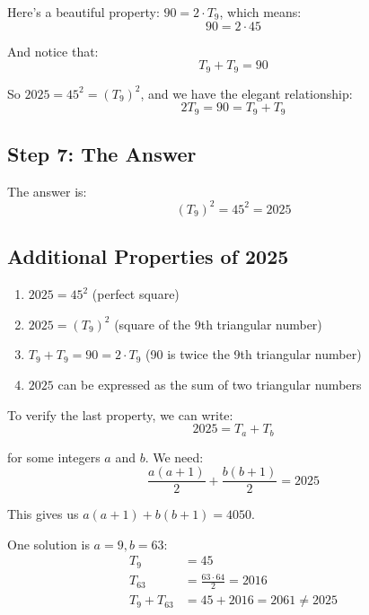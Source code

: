 \documentclass[12pt]{article}
\begin{document}
Here's a beautiful property: $90 = 2 \cdot T_9$, which means:
\begin{equation}
90 = 2 \cdot 45
\end{equation}

And notice that:
\begin{equation}
T_9 + T_9 = 90
\end{equation}

So $2025 = 45^2 = (T_9)^2$, and we have the elegant relationship:
\begin{equation}
2T_9 = 90 = T_9 + T_9
\end{equation}

\subsection*{Step 7: The Answer}

The answer is:
\begin{equation}
\boxed{(T_9)^2 = 45^2 = 2025}
\end{equation}

\subsection*{Additional Properties of 2025}

\begin{enumerate}
\item $2025 = 45^2$ (perfect square)
\item $2025 = (T_9)^2$ (square of the 9th triangular number)
\item $T_9 + T_9 = 90 = 2 \cdot T_9$ (90 is twice the 9th triangular number)
\item $2025$ can be expressed as the sum of two triangular numbers
\end{enumerate}

To verify the last property, we can write:
\begin{equation}
2025 = T_a + T_b
\end{equation}

for some integers $a$ and $b$. We need:
\begin{equation}
\frac{a(a+1)}{2} + \frac{b(b+1)}{2} = 2025
\end{equation}

This gives us $a(a+1) + b(b+1) = 4050$.

One solution is $a = 9, b = 63$:
\begin{align*}
T_9 &= 45 \\
T_{63} &= \frac{63 \cdot 64}{2} = 2016 \\
T_9 + T_{63} &= 45 + 2016 = 2061 \neq 2025
\end{align*}
\end{document}

